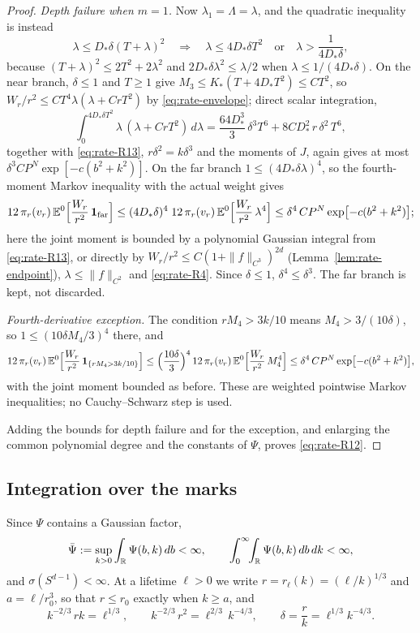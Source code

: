 \begin{proof}
\emph{Depth failure when $m=1$.} Now $\lambda_1=\Lambda=\lambda$, and the quadratic inequality is instead
\begin{equation}\label{eq:rate-R15}
\lambda\le D_*\delta(T+\lambda)^2\quad\Longrightarrow\quad\lambda\le4D_*\delta T^2\quad\text{or}\quad\lambda>\frac1{4D_*\delta},
\end{equation}
because $(T+\lambda)^2\le2T^2+2\lambda^2$ and $2D_*\delta\lambda^2\le\lambda/2$ when $\lambda\le1/(4D_*\delta)$. On the near branch, $\delta\le1$ and $T\ge1$ give $M_3\le K_*(T+4D_*T^2)\le CT^2$, so $W_r/r^2\le CT^4\lambda(\lambda+CrT^2)$ by \eqref{eq:rate-envelope}; direct scalar integration,
\[
\int_0^{4D_*\delta T^2}\lambda\,(\lambda+CrT^2)\,d\lambda=\frac{64D_*^3}3\,\delta^3T^6+8CD_*^2\,r\,\delta^2\,T^6,
\]
together with \eqref{eq:rate-R13}, $r\delta^2=k\delta^3$ and the moments of $J$, again gives at most $\delta^3CP^N\exp[-c(b^2+k^2)]$. On the far branch $1\le(4D_*\delta\lambda)^4$, so the fourth-moment Markov inequality with the actual weight gives
\[
12\,\pi_r(v_r)\,\mathbb E^0\Bigl[\frac{W_r}{r^2}\,\mathbf 1_{\rm far}\Bigr]\le(4D_*\delta)^4\;12\,\pi_r(v_r)\,\mathbb E^0\Bigl[\frac{W_r}{r^2}\,\lambda^4\Bigr]\le\delta^4\,CP^N\exp\bigl[-c(b^2+k^2)\bigr];
\]
here the joint moment is bounded by a polynomial Gaussian integral from \eqref{eq:rate-R13}, or directly by $W_r/r^2\le C(1+\|f\|_{C^3})^{2d}$ (Lemma~\ref{lem:rate-endpoint}), $\lambda\le\|f\|_{C^2}$ and \eqref{eq:rate-R4}. Since $\delta\le1$, $\delta^4\le\delta^3$. The far branch is kept, not discarded.

\emph{Fourth-derivative exception.} The condition $rM_4>3k/10$ means $M_4>3/(10\delta)$, so $1\le(10\delta M_4/3)^4$ there, and
\[
12\,\pi_r(v_r)\,\mathbb E^0\Bigl[\frac{W_r}{r^2}\,\mathbf 1_{\{rM_4>3k/10\}}\Bigr]\le\Bigl(\frac{10\delta}3\Bigr)^4\,12\,\pi_r(v_r)\,\mathbb E^0\Bigl[\frac{W_r}{r^2}\,M_4^4\Bigr]\le\delta^4\,CP^N\exp\bigl[-c(b^2+k^2)\bigr],
\]
with the joint moment bounded as before. These are weighted pointwise Markov inequalities; no Cauchy--Schwarz step is used.

Adding the bounds for depth failure and for the exception, and enlarging the common polynomial degree and the constants of $\Psi$, proves \eqref{eq:rate-R12}.
\end{proof}

\subsection*{Integration over the marks}

Since $\Psi$ contains a Gaussian factor,
\begin{equation}\label{eq:rate-Psibar}
\bar\Psi:=\sup_{k>0}\int_\mathbb R\Psi(b,k)\,db<\infty,\qquad \int_0^\infty\!\!\int_\mathbb R\Psi(b,k)\,db\,dk<\infty,
\end{equation}
and $\sigma(S^{d-1})<\infty$. At a lifetime $\ell>0$ we write $r=r_\ell(k)=(\ell/k)^{1/3}$ and $a=\ell/r_0^3$, so that $r\le r_0$ exactly when $k\ge a$, and
\begin{equation}\label{eq:rate-monomials}
k^{-2/3}\,rk=\ell^{1/3},\qquad k^{-2/3}\,r^2=\ell^{2/3}\,k^{-4/3},\qquad \delta=\frac rk=\ell^{1/3}k^{-4/3}.
\end{equation}

